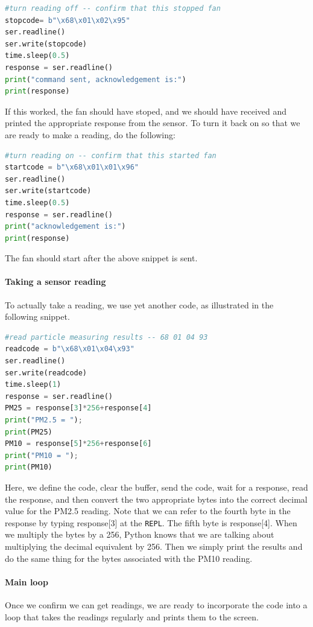 \begin{lstlisting}[language=Python]
#turn reading off -- confirm that this stopped fan
stopcode= b"\x68\x01\x02\x95"
ser.readline()
ser.write(stopcode)
time.sleep(0.5)
response = ser.readline()
print("command sent, acknowledgement is:")
print(response)
\end{lstlisting}

If this worked, the fan should have stoped, and we should have received and printed the appropriate response from the sensor.
To turn it back on so that we are ready to make a reading, do the following:

\begin{lstlisting}[language=Python]
#turn reading on -- confirm that this started fan
startcode = b"\x68\x01\x01\x96"
ser.readline()
ser.write(startcode)
time.sleep(0.5)
response = ser.readline()
print("acknowledgement is:")
print(response)

\end{lstlisting}

The fan should start after the above snippet is sent.

\paragraph{Taking a sensor reading}
To actually take a reading, we use yet another code, as illustrated in the following snippet.

\begin{lstlisting}[language=Python]
#read particle measuring results -- 68 01 04 93
readcode = b"\x68\x01\x04\x93"
ser.readline()
ser.write(readcode)
time.sleep(1)
response = ser.readline()
PM25 = response[3]*256+response[4]
print("PM2.5 = ");
print(PM25)
PM10 = response[5]*256+response[6]
print("PM10 = ");
print(PM10)
\end{lstlisting}

Here, we define the code, clear the \uart buffer, send the code, wait for a response, read the response, and then convert the two appropriate bytes into the correct decimal value for the PM2.5 reading.
Note that we can refer to the fourth byte in the response by typing response[3] at the \texttt{REPL}.
The fifth byte is response[4].  When we multiply the bytes by a 256, Python knows that we are talking about multiplying the decimal equivalent by 256.
Then we simply print the results and do the same thing for the bytes associated with the PM10 reading.

\paragraph{Main loop}
Once we confirm we can get readings, we are ready to incorporate the code into a loop that takes the readings regularly and prints them to the screen.

